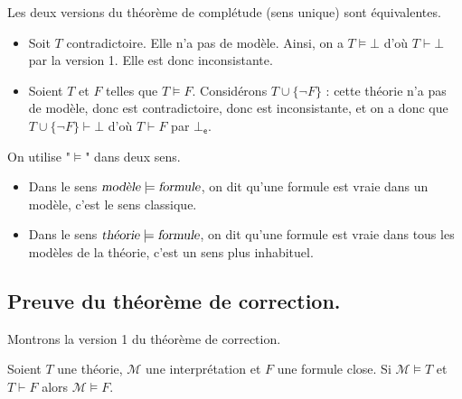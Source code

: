 \documentclass[./main]{subfiles}
\begin{document}
  \begin{prop}
    Les deux versions du théorème de complétude (sens unique) sont équivalentes.
  \end{prop}
  \begin{prv}
    \begin{itemize}
      \item Soit $T$ contradictoire. Elle n'a pas de modèle.
        Ainsi, on a $T \models \bot$ d'où $T \vdash \bot$ par la version 1. Elle est donc inconsistante.
      \item Soient $T$ et $F$ telles que $T \models F$. Considérons $T \cup \{\lnot F\}$ : cette théorie n'a pas de modèle, donc est contradictoire, donc est inconsistante, et on a donc que $T \cup \{\lnot F\} \vdash \bot$ d'où $T \vdash F$ par $\bot_\mathsf{e}$.
    \end{itemize}
  \end{prv}

  \begin{rmk}
    On utilise "$\models$" dans deux sens.
    \begin{itemize}
      \item Dans le sens $\textsl{modèle} \models \textsl{formule}$, on dit qu'une formule est vraie dans un modèle, c'est le sens classique.
      \item Dans le sens $\textsl{théorie} \models \textsl{formule}$, on dit qu'une formule est vraie dans tous les modèles de la théorie, c'est un sens plus inhabituel.
    \end{itemize}
  \end{rmk}

  \subsection{Preuve du théorème de correction.}

  Montrons la version 1 du théorème de correction.

  \begin{prop}
    Soient $T$ une théorie, $\mathcal{M}$ une interprétation et $F$ une formule close.
    Si $\mathcal{M} \models T$ et $T \vdash F$ alors $\mathcal{M} \models F$.
  \end{prop}
\end{document}

